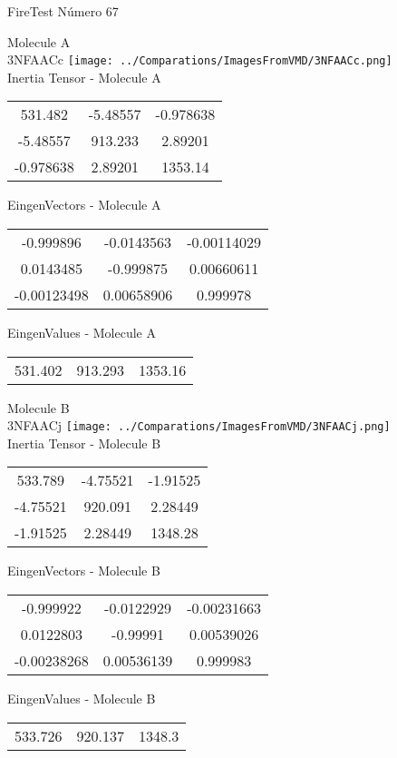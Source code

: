 \vtab[-2cm]
\begin{center}
{\large FireTest \tab Número 67}
\end{center}
\begin{multicols}{2}
\begin{center}

Molecule A \\ 
3NFAACc
\texttt{[image: ../Comparations/ImagesFromVMD/3NFAACc.png]}
\\
Inertia Tensor - Molecule A \\
\vtab

\begin{tabular}{|c c c|}
531.482	 & 	-5.48557	 & 	-0.978638	 \\
-5.48557	 & 	913.233	 & 	2.89201	 \\
-0.978638	 & 	2.89201	 & 	1353.14
\end{tabular}

\vtab
 EingenVectors - Molecule A     \\
\vtab
\begin{tabular}{|c c c|}
-0.999896	 & 	-0.0143563	 & 	-0.00114029	 \\
0.0143485	 & 	-0.999875	 & 	0.00660611	 \\
-0.00123498	 & 	0.00658906	 & 	0.999978
\end{tabular}

\vtab
 EingenValues - Molecule A     \\
\vtab
\begin{tabular}{|c c c|}
531.402	 & 	913.293	 & 	1353.16	 \\
\end{tabular}
\columnbreak

Molecule B \\ 
3NFAACj
\texttt{[image: ../Comparations/ImagesFromVMD/3NFAACj.png]}
\\
Inertia Tensor - Molecule B \\
\vtab

\begin{tabular}{|c c c|}
533.789	 & 	-4.75521	 & 	-1.91525	 \\
-4.75521	 & 	920.091	 & 	2.28449	 \\
-1.91525	 & 	2.28449	 & 	1348.28
\end{tabular}

\vtab
 EingenVectors - Molecule B     \\
\vtab
\begin{tabular}{|c c c|}
-0.999922	 & 	-0.0122929	 & 	-0.00231663	 \\
0.0122803	 & 	-0.99991	 & 	0.00539026	 \\
-0.00238268	 & 	0.00536139	 & 	0.999983
\end{tabular}

\vtab
 EingenValues - Molecule B     \\
\vtab
\begin{tabular}{|c c c|}
533.726	 & 	920.137	 & 	1348.3	 \\
\end{tabular}

\end{center}
\end{multicols}
